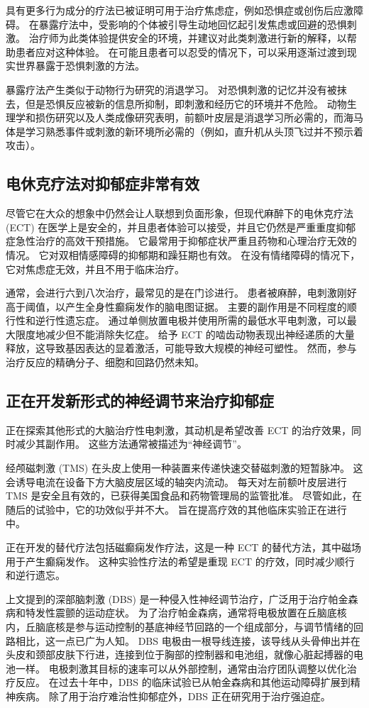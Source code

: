 具有更多行为成分的疗法已被证明可用于治疗焦虑症，例如恐惧症或创伤后应激障碍。 在暴露疗法中，受影响的个体被引导生动地回忆起引发焦虑或回避的恐惧刺激。 治疗师为此类体验提供安全的环境，并建议对此类刺激进行新的解释，以帮助患者应对这种体验。 在可能且患者可以忍受的情况下，可以采用逐渐过渡到现实世界暴露于恐惧刺激的方法。

暴露疗法产生类似于动物行为研究的消退学习。 对恐惧刺激的记忆并没有被抹去，但是恐惧反应被新的信息所抑制，即刺激和经历它的环境并不危险。 动物生理学和损伤研究以及人类成像研究表明，前额叶皮层是消退学习所必需的，而海马体是学习熟悉事件或刺激的新环境所必需的（例如，直升机从头顶飞过并不预示着攻击）。

\subsection{电休克疗法对抑郁症非常有效}
尽管它在大众的想象中仍然会让人联想到负面形象，但现代麻醉下的电休克疗法 (ECT) 在医学上是安全的，并且患者体验可以接受，并且它仍然是严重重度抑郁症急性治疗的高效干预措施。 它最常用于抑郁症状严重且药物和心理治疗无效的情况。 它对双相情感障碍的抑郁期和躁狂期也有效。 在没有情绪障碍的情况下，它对焦虑症无效，并且不用于临床治疗。

通常，会进行六到八次治疗，最常见的是在门诊进行。 患者被麻醉，电刺激刚好高于阈值，以产生全身性癫痫发作的脑电图证据。 主要的副作用是不同程度的顺行性和逆行性遗忘症。 通过单侧放置电极并使用所需的最低水平电刺激，可以最大限度地减少但不能消除失忆症。 给予 ECT 的啮齿动物表现出神经递质的大量释放，这导致基因表达的显着激活，可能导致大规模的神经可塑性。 然而，参与治疗反应的精确分子、细胞和回路仍然未知。

\subsection{正在开发新形式的神经调节来治疗抑郁症}
正在探索其他形式的大脑治疗性电刺激，其动机是希望改善 ECT 的治疗效果，同时减少其副作用。 这些方法通常被描述为“神经调节”。

经颅磁刺激 (TMS) 在头皮上使用一种装置来传递快速交替磁刺激的短暂脉冲。 这会诱导电流在设备下方大脑皮层区域的轴突内流动。 每天对左前额叶皮层进行 TMS 是安全且有效的，已获得美国食品和药物管理局的监管批准。 尽管如此，在随后的试验中，它的功效似乎并不大。 旨在提高疗效的其他临床实验正在进行中。

正在开发的替代疗法包括磁癫痫发作疗法，这是一种 ECT 的替代方法，其中磁场用于产生癫痫发作。 这种实验性疗法的希望是重现 ECT 的疗效，同时减少顺行和逆行遗忘。

上文提到的深部脑刺激 (DBS) 是一种侵入性神经调节治疗，广泛用于治疗帕金森病和特发性震颤的运动症状。 为了治疗帕金森病，通常将电极放置在丘脑底核内，丘脑底核是参与运动控制的基底神经节回路的一个组成部分，与调节情绪的回路相比，这一点已广为人知。 DBS 电极由一根导线连接，该导线从头骨伸出并在头皮和颈部皮肤下行进，连接到位于胸部的控制器和电池组，就像心脏起搏器的电池一样。 电极刺激其目标的速率可以从外部控制，通常由治疗团队调整以优化治疗反应。 在过去十年中，DBS 的临床试验已从帕金森病和其他运动障碍扩展到精神疾病。 除了用于治疗难治性抑郁症外，DBS 正在研究用于治疗强迫症。

